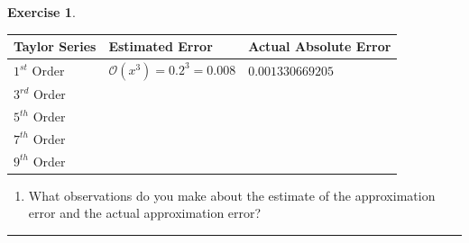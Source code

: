 \documentclass[
]{book}
\providecommand{\tightlist}{%
  \setlength{\itemsep}{0pt}\setlength{\parskip}{0pt}}
\theoremstyle{definition}
\theoremstyle{definition}
\theoremstyle{definition}
\newtheorem{exercise}{Exercise}[chapter]
\theoremstyle{remark}
\begin{document}
\begin{exercise}
\begin{longtable}[]{@{}lll@{}}
\toprule
Taylor Series & Estimated Error & Actual Absolute Error\tabularnewline
\midrule
\endhead
\(1^{st}\) Order & \(\mathcal{O}(x^3) = 0.2^3 = 0.008\) & \(0.001330669205\)\tabularnewline
\(3^{rd}\) Order & &\tabularnewline
\(5^{th}\) Order & &\tabularnewline
\(7^{th}\) Order & &\tabularnewline
\(9^{th}\) Order & &\tabularnewline
\bottomrule
\end{longtable}

\begin{enumerate}
\def\labelenumi{\alph{enumi}.}
\setcounter{enumi}{5}
\tightlist
\item
  What observations do you make about the estimate of the approximation error and the actual approximation error?\\
\end{enumerate}
\end{exercise}

\begin{center}\rule{0.5\linewidth}{0.5pt}\end{center}
\end{document}
